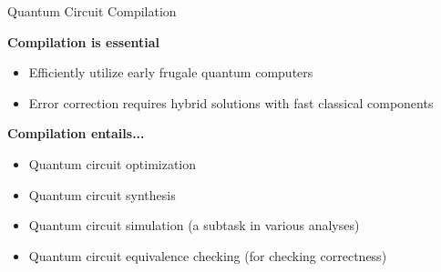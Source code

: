 \begin{frame}{Quantum Circuit Compilation}


	\begin{block}{\bf Compilation is essential}
		\begin{itemize}
		\item Efficiently utilize early frugale quantum computers
		\item Error correction requires hybrid solutions with fast classical components
		\end{itemize}
	\end{block}

\pause
\vspace{-.5em}

	\begin{block}{\bf Compilation entails...}
		\begin{itemize}%
		\item<+-> Quantum circuit optimization
		\item<+-> Quantum circuit synthesis
		\item<+-> {\color{OliveGreen} Quantum circuit simulation}			\hfill (a subtask in various analyses)
		\item<+-> {\color{red} Quantum circuit equivalence checking}  \hfill (for checking correctness)%
		\end{itemize}
	\end{block}

\vspace{-.8em}


\end{frame}
